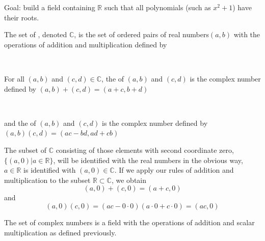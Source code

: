 \documentclass[11pt,fleqn]{book} %
\begin{document}
Goal: build a field containing $\mathbb{R}$ such that all polynomials (such as $x^2 + 1$) have their roots.

\setcounter{chapter}{5}
\setcounter{section}{1}
\setcounter{definitionT}{1}
\begin{definition}
    The set of , denoted $\mathbb{C}$, is the set of ordered pairs of real numbers$ (a, b)$ with the operations of addition and multiplication defined by

    {~~~}

    For all $(a, b)$ and $(c, d) \in \mathbb{C}$, the  of $(a, b)$ and $(c, d)$ is the complex number defined by $(a, b) + (c, d) = (a + c, b + d)$

    {~~~}

    and the  of $(a, b)$ and $(c, d)$ is the complex number defined by $(a, b)(c, d) = (ac - bd, ad + cb)$
\end{definition}
\setcounter{section}{2}
\setcounter{chapter}{1}

The subset of $\mathbb{C}$ consisting of those elements with second coordinate zero, $\{ (a, 0) | a \in \mathbb{R} \}$, will be identified with the real numbers in the obvious way, $a \in \mathbb{R}$ is identified with $(a, 0) \in \mathbb{C}$. If we apply our rules of addition and multiplication to the subset $\mathbb{R} \subset \mathbb{C}$, we obtain
$$(a, 0) + (c, 0) = (a + c, 0)$$
and
$$(a, 0)(c, 0) = (ac - 0 \cdot 0)(a \cdot 0 + c \cdot 0) = (ac, 0)$$

\setcounter{chapter}{5}
\setcounter{section}{1}
\setcounter{dummy}{4}
\begin{proposition}
The set of complex numbers is a field with the operations of addition and scalar multiplication as defined previously.
\end{proposition}
\setcounter{section}{2}
\setcounter{chapter}{1}
\end{document}
